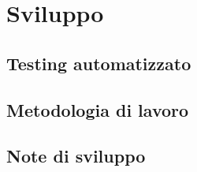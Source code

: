 \section{Sviluppo}
\subsection*{Testing automatizzato}
\subsection*{Metodologia di lavoro}
\subsection*{Note di sviluppo}